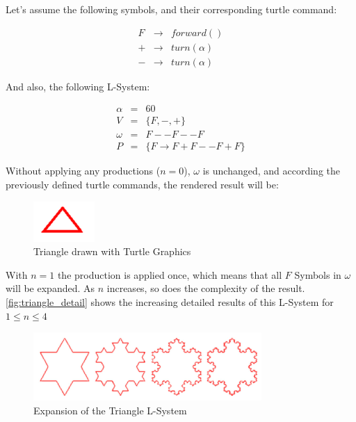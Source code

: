 \documentclass{acmtog}
\begin{document}
Let's assume the following symbols, and their corresponding turtle command:

\begin{eqnarray*}
    F & \rightarrow &  forward()  \\
    + & \rightarrow &  turn(\alpha)   \\
    - & \rightarrow &  turn(\alpha)  
\end{eqnarray*}

And also, the following L-System:

\begin{eqnarray*}
  \alpha  &=& 60                         \\
  V       &=& \{F, -, +\}                \\
  \omega  &=& F--F--F                     \\
  P       &=& \{F \rightarrow F+F--F+F \}    
\end{eqnarray*}

Without applying any productions ($n=0$), $\omega$ is unchanged, and according the previously defined turtle commands, the rendered result will be:

\begin{figure}[!htp]
  \begin{center}
    \includegraphics{images/1_triangle}
    \caption{Triangle drawn with Turtle Graphics \label{fig:triangle}}
    \end{center}
\end{figure}

With $n=1$ the production is applied once, which means that all $F$ Symbols in $\omega$ will be expanded. As $n$ increases, so does the complexity of the result. \autoref{fig:triangle_detail} shows the increasing detailed results of this L-System for $1 \leq n \leq 4$

\begin{figure}[!htp]
  \begin{center}
    \includegraphics{images/2_triangle_detail}
    \caption{Expansion of the Triangle L-System \label{fig:triangle_detail}}
    \end{center}
\end{figure}
\end{document}
